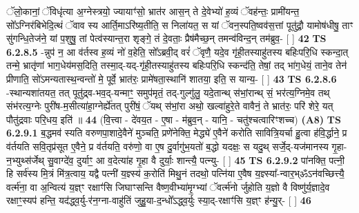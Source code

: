 \documentclass[17pt]{extarticle}
\begin{document}
                  ॅलो॒कानां॒ ॅविधृ॑त्या अ॒ग्नेस्त्रयो॒ ज्यायाꣳ॑सो॒ भ्रात॑र आस॒न् ते दे॒वेभ्यो॑ ह॒व्यं ॅवह॑न्तः॒ प्रामी॑यन्त॒ सो᳚ऽग्निर॑बिभेदि॒त्थं ॅवाव स्य आर्ति॒माऽरि॑ष्य॒तीति॒ स निला॑यत॒ स यां ॅवन॒स्पति॒ष्वव॑स॒त्तां पूतु॑द्रौ॒ यामोष॑धीषु॒ ताꣳ सु॑गन्धि॒तेज॑ने॒ यां प॒शुषु॒ तां पेत्व॑स्यान्त॒रा शृङ्गे॒ तं दे॒वताः॒ प्रैष॑मैच्छ॒न् तमन्व॑विन्द॒न् तम॑ब्रुव॒- [  ] \textbf{  42} \newline
                  \newline
                                \textbf{ TS 6.2.8.5} \newline
                  -न्नुप॑ न॒ आ व॑र्तस्व ह॒व्यं नो॑ व॒हेति॒ सो᳚ऽब्रवी॒द् वरं॑ ॅवृणै॒ यदे॒व गृ॑ही॒तस्याहु॑तस्य बहिःपरि॒धि स्कन्दा॒त् तन्मे॒ भ्रातृ॑णां भाग॒धेय॑मस॒दिति॒ तस्मा॒द्-यद्-गृ॑ही॒तस्याहु॑तस्य बहिःपरि॒धि स्कन्द॑ति॒ तेषां॒ तद् भा॑ग॒धेयं॒ ताने॒व तेन॑ प्रीणाति॒ सो॑ऽमन्यतास्थ॒न्वन्तो॑ मे॒ पूर्वे॒ भ्रात॑रः॒ प्रामे॑षता॒स्थानि॑ शातया॒ इति॒ स यान्य॒- [  ] \textbf{  43} \newline
                  \newline
                                \textbf{ TS 6.2.8.6} \newline
                  -स्थान्यशा॑तयत॒ तत् पूतु॑द्र्व-भव॒द्-यन्माꣳ॒॒ समुप॑मृतं॒ तद्-गुल्गु॑लु॒ यदे॒तान्थ् स॑भां॒रान्थ् सं॒ भर॑त्य॒ग्निमे॒व तथ् संभ॑रत्य॒ग्नेः पुरी॑ष-म॒सीत्या॑हा॒ग्नेर्ह्ये॑तत् पुरी॑षं॒ ॅयथ् स॑भां॒रा अथो॒ खल्वा॑हुरे॒ते वावैनं॒ ते भ्रात॑रः॒ परि॑ शेरे॒ यत् पौतु॑द्रवाः परि॒धय॒ इति॑ ॥ \textbf{  44 } \newline
                  \newline
                      (वि॒त्त्वा - दे॑वय॒त - ए॒षा - म॑ब्रुव॒न् - यानि॒ - चतु॑श्चत्वारिꣳशच्च)  \textbf{(A8)} \newline \newline
                                        \textbf{ TS 6.2.9.1} \newline
                  ब॒द्धमव॑ स्यति वरुणपा॒शादे॒वैने॑ मुञ्चति॒ प्रणे॑नेक्ति॒ मेद्ध्ये॑ ए॒वैने॑ करोति सावित्रि॒यर्चा हु॒त्वा ह॑वि॒र्द्धाने॒ प्र व॑र्तयति सवि॒तृप्र॑सूत ए॒वैने॒ प्र व॑र्तयति॒ वरु॑णो॒ वा ए॒ष दु॒र्वागु॑भ॒यतो॑ ब॒द्धो यदक्षः॒ स यदु॒थ् सर्जे॒द्-यज॑मानस्य गृ॒हा-न॒भ्युथ्स॑र्जेथ् सु॒वाग्दे॑व॒ दुर्याꣳ॒॒ आ व॒देत्या॑ह गृ॒हा वै दुर्याः॒ शान्त्यै॒ पत्न्यु- [  ] \textbf{  45} \newline
                  \newline
                                \textbf{ TS 6.2.9.2} \newline
                  पा॑नक्ति॒ पत्नी॒ हि सर्व॑स्य मि॒त्रं मि॑त्र॒त्वाय॒ यद्वै पत्नी॑ य॒ज्ञ्स्य॑ क॒रोति॑ मिथु॒नं तदथो॒ पत्नि॑या ए॒वैष य॒ज्ञ्स्या᳚-न्वार॒भ्ॐऽन॑वच्छित्त्यै॒ वर्त्म॑ना॒ वा अ॒न्वित्य॑ य॒ज्ञ्ꣳ रक्षाꣳ॑सि जिघाꣳसन्ति वैष्ण॒वीभ्या॑मृ॒ग्भ्यां ॅवर्त्म॑नो र्जुहोति य॒ज्ञो वै विष्णु॑र्य॒ज्ञादे॒व रक्षाꣳ॒॒स्यप॑ हन्ति॒ यद॑द्ध्व॒र्यु-र॑न॒ग्ना-वाहु॑तिं जुहु॒या-द॒न्धो᳚ऽद्ध्व॒र्युः स्या॒द्-रक्षाꣳ॑सि य॒ज्ञ्ꣳ ह॑न्यु॒र्- [  ] \textbf{  46} \newline
\end{document}
